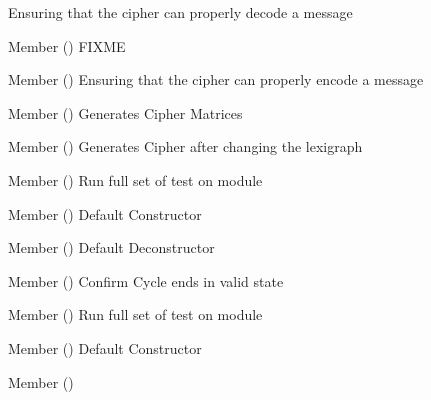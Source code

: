 \begin{DoxyRefList}
Ensuring that the cipher can properly decode a message  
\item[Member \doxylink{class_test_ciphers_ae2915b859096bf90c357d7b5b542a89d}{Test\+Ciphers\+::display\+Matrix} ()]\label{todo__todo000227}%
%
FIXME  
\item[Member \doxylink{class_test_ciphers_a1946966427de5adbd6c94c12590d1adb}{Test\+Ciphers\+::encode} ()]\label{todo__todo000229}%
%
Ensuring that the cipher can properly encode a message  
\item[Member \doxylink{class_test_ciphers_aa23fbf645240cdb2d536408e98aa93aa}{Test\+Ciphers\+::generate\+Matrix} ()]\label{todo__todo000230}%
%
Generates Cipher Matrices\textquotesingle{}  
\item[Member \doxylink{class_test_ciphers_a98f84a007ac2305e2e15346791b5cbcb}{Test\+Ciphers\+::swapped\+Lexigraph} ()]\label{todo__todo000231}%
%
Generates Cipher after changing the lexigraph  
\item[Member \doxylink{class_test_ciphers_ad80c007f03203bd89adc7118219ecdf2}{Test\+Ciphers\+::test\+\_\+all} ()]\label{todo__todo000226}%
%
Run full set of test on module  
\item[Member \doxylink{class_test_ciphers_a45676e93aada4e8ebcf08a96c4df5cac}{Test\+Ciphers\+::Test\+Ciphers} ()]\label{todo__todo000225}%
%
Default Constructor  
\item[Member \doxylink{class_test_ciphers_a5626991edfad49b7e74fdf0a213f2492}{Test\+Ciphers\+::\texorpdfstring{$\sim$}{\string~}\+Test\+Ciphers} ()]\label{todo__todo000232}%
%
Default Deconstructor  
\item[Member \doxylink{class_test_clock_a9e28c3baa6fc61f12d5d259e23961188}{Test\+Clock\+::do\+Cycle\+Work} ()]\label{todo__todo000235}%
%
Confirm Cycle ends in valid state  
\item[Member \doxylink{class_test_clock_a17a7ecaa15c797b28041f38d725d4ad2}{Test\+Clock\+::test\+\_\+all} ()]\label{todo__todo000234}%
%
Run full set of test on module  
\item[Member \doxylink{class_test_clock_ab695f04527560524152ed78dabe4d2a9}{Test\+Clock\+::Test\+Clock} ()]\label{todo__todo000233}%
%
Default Constructor  
\item[Member \doxylink{class_test_clock_a2d427de10a85065874608a0626813a19}{Test\+Clock\+::\texorpdfstring{$\sim$}{\string~}\+Test\+Clock} ()]\label{todo__todo000236}%

\end{DoxyRefList}
